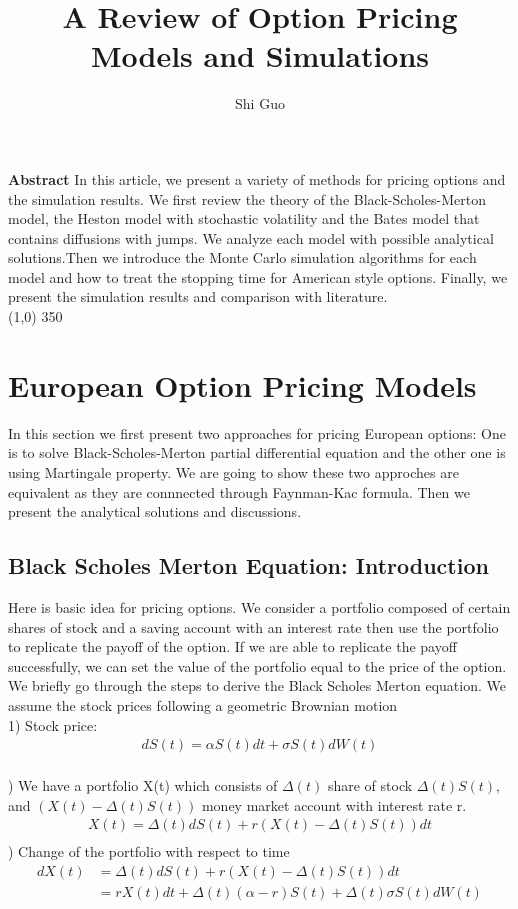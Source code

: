 \documentclass[a4paper]{article}
\title{A Review of Option Pricing Models and Simulations}
\author{Shi Guo}
\begin{document}
\maketitle
{\bf Abstract} In this article, we present a variety of methods for pricing options and the simulation results. We first review the theory of the Black-Scholes-Merton model, the Heston model with stochastic volatility and the Bates model that contains diffusions with jumps. We analyze each model with possible analytical solutions.Then we introduce the Monte Carlo simulation algorithms for each model and how to treat the stopping time for American style options. Finally, we present the simulation results and comparison with literature.\\
\line(1,0) {350}
\section{European Option Pricing Models}
In this section we first present two approaches for pricing European options: One is to solve Black-Scholes-Merton partial differential equation and the other one is using Martingale property. We are going to show these two approches are equivalent as they are connnected through Faynman-Kac formula. Then we present the analytical solutions and discussions. 
\subsection{Black Scholes Merton Equation: Introduction}
Here is basic idea for pricing options. We consider a portfolio composed of certain shares of stock and a saving account with an interest rate then use the portfolio to replicate the payoff of the option. If we are able to replicate the payoff successfully, we can set the value of the portfolio equal to the price of the option. We briefly go through the steps to derive the Black Scholes Merton equation. We assume the stock prices following a geometric Brownian motion\\
1) Stock price:\\
\begin{align*}
	 dS(t) = \alpha S(t) dt + \sigma S(t) dW(t)\\
\end{align*}
 
) We have a portfolio X(t) which consists of $\Delta(t)$ share of stock  $\Delta(t) S(t)$, and $(X(t) - \Delta (t) S(t))$ money market account with interest rate r. \\  
\begin{align*}
	X(t) = \Delta(t) dS(t) + r(X(t) -\Delta(t) S(t)) dt\\
\end{align*}
) Change of the portfolio with respect to time
\begin{align*}
	  d X(t) & = \Delta(t) d S(t) + r(X(t) - \Delta(t) S(t)) dt \\
             & = r X(t) dt + \Delta(t) (\alpha - r )S(t) + \Delta (t) \sigma S(t) d W(t) \\
\end{align*}
                      
\end{document}
